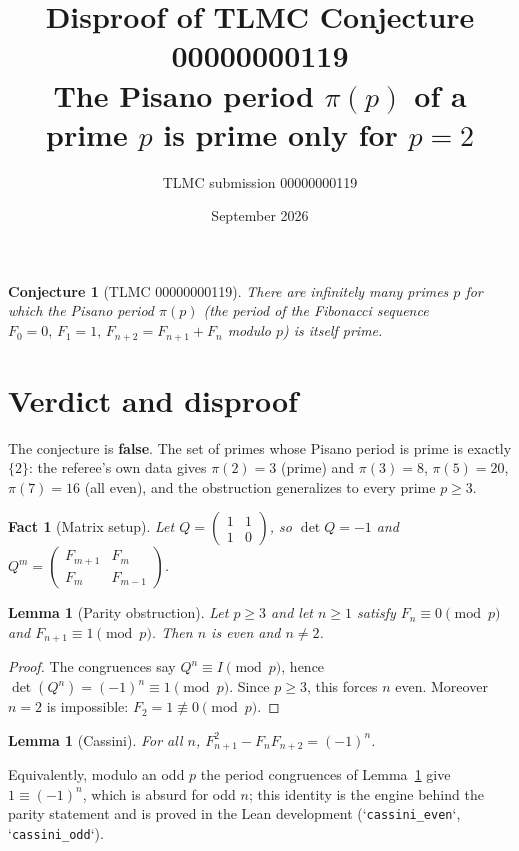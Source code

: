 \documentclass[11pt]{article}
\title{Disproof of TLMC Conjecture 00000000119\\
\large The Pisano period $\pi(p)$ of a prime $p$ is prime only for $p=2$}
\author{TLMC submission 00000000119}
\date{September 2026}
\newtheorem{lemma}[theorem]{Lemma}
\newtheorem{conjecture}[theorem]{Conjecture}
\newtheorem{fact}[theorem]{Fact}
\begin{document}
\maketitle

\begin{conjecture}[TLMC 00000000119]
There are infinitely many primes $p$ for which the Pisano period $\pi(p)$
(the period of the Fibonacci sequence $F_0=0,\,F_1=1,\,F_{n+2}=F_{n+1}+F_n$
modulo $p$) is itself prime.
\end{conjecture}

\section{Verdict and disproof}

The conjecture is \textbf{false}.  The set of primes whose Pisano period is
prime is exactly $\{2\}$:  the referee's own data gives $\pi(2)=3$ (prime)
and $\pi(3)=8$, $\pi(5)=20$, $\pi(7)=16$ (all even), and the obstruction
generalizes to every prime $p\ge 3$.

\begin{fact}[Matrix setup]
Let $Q=\begin{pmatrix}1&1\\1&0\end{pmatrix}$, so $\det Q=-1$ and
$Q^m=\begin{pmatrix}F_{m+1}&F_m\\F_m&F_{m-1}\end{pmatrix}$.
\end{fact}

\begin{lemma}[Parity obstruction]\label{lem:parity}
Let $p\ge 3$ and let $n\ge 1$ satisfy $F_n\equiv 0\pmod p$ and
$F_{n+1}\equiv 1\pmod p$.  Then $n$ is even and $n\ne 2$.
\end{lemma}

\begin{proof}
The congruences say $Q^n\equiv I\pmod p$, hence
$\det(Q^n)=(-1)^n\equiv 1\pmod p$.  Since $p\ge 3$, this forces $n$ even.
Moreover $n=2$ is impossible: $F_2=1\not\equiv 0\pmod p$.
\end{proof}

\begin{lemma}[Cassini]\label{lem:cassini}
For all $n$, $F_{n+1}^2-F_nF_{n+2}=(-1)^n$.
\end{lemma}

Equivalently, modulo an odd $p$ the period congruences of
Lemma~\ref{lem:parity} give $1\equiv(-1)^n$, which is absurd for odd $n$;
this identity is the engine behind the parity statement and is proved in
the Lean development (`\texttt{cassini\_even}`, `\texttt{cassini\_odd}`).
\end{document}
